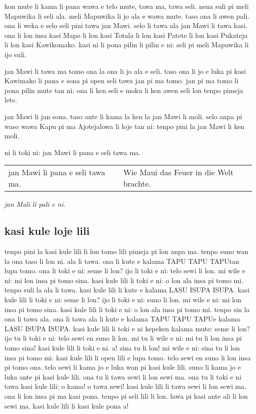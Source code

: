 kon mute li kama li pana wawa e telo mute, tawa ma, tawa seli.
nena suli pi meli Mapuwika li seli ala. 
meli Mapuwika li jo ala e wawa mute. 
taso ona li awen pali. 
ona li weka e selo seli pini tawa jan Mawi. 
selo li tawa ala jan Mawi li tawa kasi. 
ona li lon insa kasi Mapo li lon kasi Totala li lon kasi Patete li lon kasi Pukateja li lon kasi Kawikomako. 
kasi ni li pona pilin li pilin e ni: seli pi meli Mapuwika li ijo suli.

jan Mawi li tawa ma tomo ona la ona li jo ala e seli. 
taso ona li jo e luka pi kasi Kawimako li pana e sona pi open seli tawa jan pi ma tomo.   
jan pi ma tomo li pona pilin mute tan ni: ona li ken seli e moku li ken awen seli lon tenpo pimeja lete.

jan Mawi li jan sona. 
taso ante li kama la ken la jan Mawi li moli. 
selo anpa pi waso wawa Kapu pi ma Ajotejalowa li loje tan ni: tenpo pini la jan Mawi li ken moli.

ni li toki ni: jan Mawi li pana e seli tawa ma.

\begin{supertabular}{p{5,5cm}|ll}
jan Mawi li pana e seli tawa ma. && Wie Maui das Feuer in die Welt brachte. \\
\end{supertabular}

\textit{jan Mali li pali e ni. \cite{www:astrodonunt:01}}
%
\subsection{kasi kule loje lili}

tenpo pini la kasi kule lili li lon tomo lili pimeja pi lon anpa ma. 
tenpo suno wan la ona taso li lon ni. 
ala li tawa. 
ona li kute e kalama \glqq TAPU TAPU TAPU\grqq  tan lupa tomo.
ona li toki e ni: \glqq seme li lon?\grqq 
ijo li toki e ni: \glqq telo sewi li lon. 
mi wile e ni: mi lon insa pi tomo sina.\grqq 
kasi kule lili li toki e ni: \glqq o lon ala insa pi tomo mi.\grqq 
tenpo suli la ala li tawa. 
kasi kule lili li kute e kalama \glqq LASU ISUPA ISUPA\grqq .
kasi kule lili li toki e ni: \glqq seme li lon?\grqq 
ijo li toki e ni: \glqq suno li lon. 
mi wile e ni: mi lon insa pi tomo sina.\grqq 
kasi kule lili li toki e ni: \glqq o lon ala insa pi tomo mi.\grqq  
tenpo sin la ona li tawa ala.
ona li tawa ala li kute e kalama \glqq TAPU TAPU TAPU\grqq  e kalama \glqq LASU ISUPA ISUPA\grqq .
kasi kule lili li toki e ni kepeken kalama mute: \glqq seme li lon?\grqq 
ijo tu li toki e ni: \glqq telo sewi en suno li lon. 
mi tu li wile e ni: mi tu li lon insa pi tomo sina!\grqq 
kasi kule lili li toki e ni.
\grqq a! 
sina tu li lon! 
mi wile e ni: sina tu li lon insa pi tomo mi.\grqq 
kasi kule lili li open lili e lupa tomo. 
telo sewi en suno li lon insa pi tomo ona. 
telo sewi li kama jo e luka wan pi kasi kule lili. 
suno li kama jo e luka ante pi kasi kule lili. 
ona tu li tawa sewi li lon sewi ma. 
ona tu li toki e ni tawa kasi kule lili: \glqq o kama! 
o tawa sewi!\grqq 
kasi kule lili li tawa sewi li lon sewi ma. 
ona li lon insa pi ma kasi pona. 
tenpo pi seli lili li lon. 
lawa pi kasi ante ali li lon sewi ma. 
kasi kule lili li kasi kule pona a!

